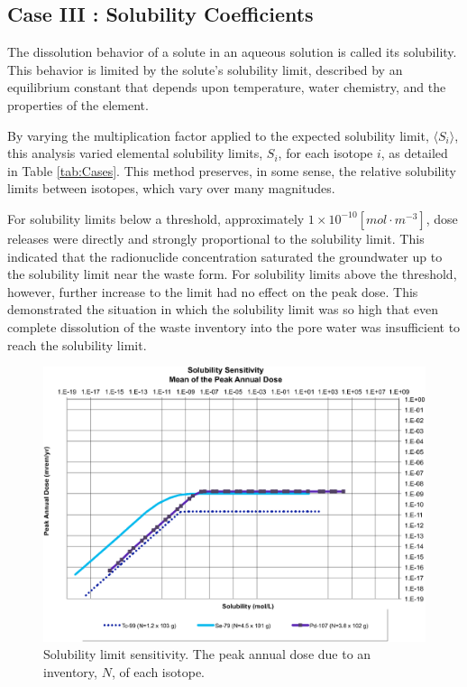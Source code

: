 
\subsection{Case III : Solubility Coefficients}

The dissolution behavior of a solute in an aqueous solution is called its 
solubility. This behavior is limited by the solute's solubility limit, described  
by an equilibrium constant that depends upon temperature, water chemistry, and 
the properties of the element. 

By varying the multiplication factor applied to the expected solubility limit, 
$\langle S_i\rangle$, this analysis varied elemental solubility limits, $S_i$, 
for each isotope $i$, as detailed in Table \ref{tab:Cases}.
This method preserves, in some sense, the relative solubility 
limits between isotopes, which vary over many magnitudes.

For solubility limits below a threshold, approximately 
$1\times10^{-10}[mol\cdot m^{-3}]$, dose releases were directly 
and strongly proportional to the solubility limit. This indicated that the radionuclide 
concentration saturated the groundwater up to the solubility limit near the 
waste form.  For solubility limits above the threshold, however, further 
increase to the limit had no effect on the peak dose. This demonstrated the 
situation in which the solubility limit was so high that even complete 
dissolution of the waste inventory into the pore water was insufficient to reach 
the solubility limit.

\begin{figure}[ht]
  \centering
  \includegraphics[width=\linewidth]{Solubility_Summary.eps}
  \caption{Solubility limit sensitivity. The peak annual dose due to an 
  inventory, 
  $N$, of each isotope.}
  \label{fig:SolSum}
\end{figure}
